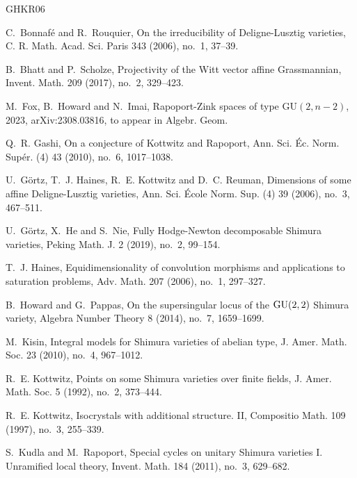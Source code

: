 \begin{thebibliography}{GHKR06}
	\providecommand{\url}[1]{\texttt{#1}}
	\providecommand{\urlprefix}{URL }
	\providecommand{\eprint}[2][]{\url{#2}}
	
	C.~Bonnaf\'{e} and R.~Rouquier, On the irreducibility of {D}eligne-{L}usztig
	varieties, C. R. Math. Acad. Sci. Paris 343 (2006), no.~1, 37--39.
	
	B.~Bhatt and P.~Scholze, Projectivity of the {W}itt vector affine
	{G}rassmannian, Invent. Math. 209 (2017), no.~2, 329--423.
	
	M.~Fox, B.~Howard and N.~Imai, Rapoport-Zink spaces of type
	$\mathrm{GU}(2,n-2)$, 2023, arXiv:2308.03816, to appear in Algebr. Geom.
	
	Q.~R. Gashi, On a conjecture of {K}ottwitz and {R}apoport, Ann. Sci. \'{E}c.
	Norm. Sup\'{e}r. (4) 43 (2010), no.~6, 1017--1038.
	
	U.~G\"{o}rtz, T.~J. Haines, R.~E. Kottwitz and D.~C. Reuman, Dimensions of some
	affine {D}eligne-{L}usztig varieties, Ann. Sci. \'{E}cole Norm. Sup. (4) 39
	(2006), no.~3, 467--511.
	
	U.~G\"{o}rtz, X.~He and S.~Nie, Fully {H}odge-{N}ewton decomposable {S}himura
	varieties, Peking Math. J. 2 (2019), no.~2, 99--154.
	
	T.~J. Haines, Equidimensionality of convolution morphisms and applications to
	saturation problems, Adv. Math. 207 (2006), no.~1, 297--327.
	
	B.~Howard and G.~Pappas, On the supersingular locus of the {${\rm GU}(2,2)$}
	{S}himura variety, Algebra Number Theory 8 (2014), no.~7, 1659--1699.
	
	M.~Kisin, Integral models for {S}himura varieties of abelian type, J. Amer.
	Math. Soc. 23 (2010), no.~4, 967--1012.
	
	R.~E. Kottwitz, Points on some {S}himura varieties over finite fields, J. Amer.
	Math. Soc. 5 (1992), no.~2, 373--444.
	
	R.~E. Kottwitz, Isocrystals with additional structure. {II}, Compositio Math.
	109 (1997), no.~3, 255--339.
	
	S.~Kudla and M.~Rapoport, Special cycles on unitary {S}himura varieties {I}.
	{U}nramified local theory, Invent. Math. 184 (2011), no.~3, 629--682.
	

\end{thebibliography}
